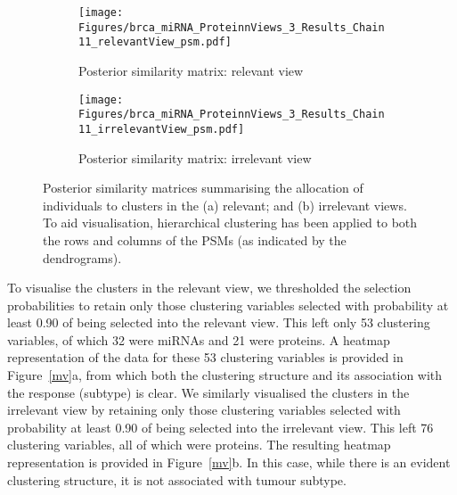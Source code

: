 \documentclass[12pt]{article}
\begin{document}
\begin{figure}[!ht]\centering
    \begin{subfigure}[b]{0.49\textwidth}\centering
{\texttt{[image: Figures/brca\_miRNA\_ProteinnViews\_3\_Results\_Chain11\_relevantView\_psm.pdf]}}
\caption{Posterior similarity matrix: relevant view}
    \end{subfigure}
    \begin{subfigure}[b]{0.49\textwidth}\centering
{\texttt{[image: Figures/brca\_miRNA\_ProteinnViews\_3\_Results\_Chain11\_irrelevantView\_psm.pdf]}}
\caption{Posterior similarity matrix: irrelevant view}
    \end{subfigure}\caption{Posterior similarity matrices summarising the allocation of individuals to clusters in the (a) relevant; and (b) irrelevant views.  To aid visualisation, hierarchical clustering has been applied to both the rows and columns of the PSMs (as indicated by the dendrograms).}\label{PSMs}
\end{figure}

To visualise the clusters in the relevant view, we thresholded the selection probabilities to retain only those clustering variables selected with probability at least 0.90 of being selected into the relevant view.  This left only 53 clustering variables, of which 32 were miRNAs and 21 were proteins.  A heatmap representation of the data for these 53 clustering variables is provided in Figure~\ref{mv}a, from which both the clustering structure and its association with the response (subtype) is clear.  We similarly visualised the clusters in the irrelevant view by retaining only those clustering variables selected with probability at least 0.90 of being selected into the irrelevant view.  This left 76 clustering variables, all of which were proteins.  The resulting heatmap representation is provided in Figure~\ref{mv}b.  In this case, while there is an evident clustering structure, it is not associated with tumour subtype. 
\end{document}
